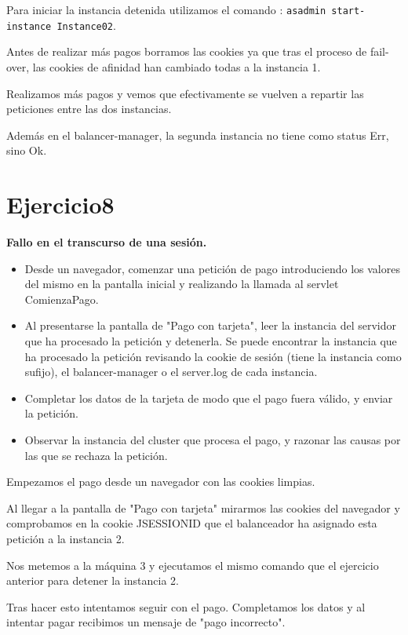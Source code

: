 \documentclass[a4paper, 10pt]{article}
\begin{document}
Para iniciar la instancia detenida utilizamos el comando : \texttt{asadmin start-instance Instance02}.

Antes de realizar más pagos borramos las cookies ya que tras el proceso de fail-over, las cookies de afinidad han cambiado todas a la instancia 1.

Realizamos más pagos y vemos que efectivamente se vuelven a repartir las peticiones entre las dos instancias.

Además en el balancer-manager, la segunda instancia no tiene como status Err, sino Ok.

\section{Ejercicio8}
\begin{mdframed}
	 \textbf{Fallo en el transcurso de una sesión.}
	 \begin{itemize}
	  \item Desde un navegador, comenzar una petición de pago introduciendo los valores del mismo en la
	  pantalla inicial y realizando la llamada al servlet ComienzaPago.
	  \item Al presentarse la pantalla de "Pago con tarjeta", leer la instancia del servidor que ha procesado la
	  petición y detenerla. Se puede encontrar la instancia que ha procesado la petición revisando la
	  cookie de sesión (tiene la instancia como sufijo), el balancer-manager o el server.log de cada
	  instancia.
	  \item Completar los datos de la tarjeta de modo que el pago fuera válido, y enviar la petición.
	  \item Observar la instancia del cluster que procesa el pago, y razonar las causas por las que se rechaza
	  la petición. 	
	 \end{itemize}
	
\end{mdframed}

Empezamos el pago desde un navegador con las cookies limpias.

Al llegar a la pantalla de "Pago con tarjeta" mirarmos las cookies del navegador y comprobamos en la cookie JSESSIONID que el balanceador ha asignado esta petición a la instancia 2.

Nos metemos a la máquina 3 y ejecutamos el mismo comando que el ejercicio anterior para detener la instancia 2.

Tras hacer esto intentamos seguir con el pago. Completamos los datos y al intentar pagar recibimos un mensaje de "pago incorrecto".
\end{document}
